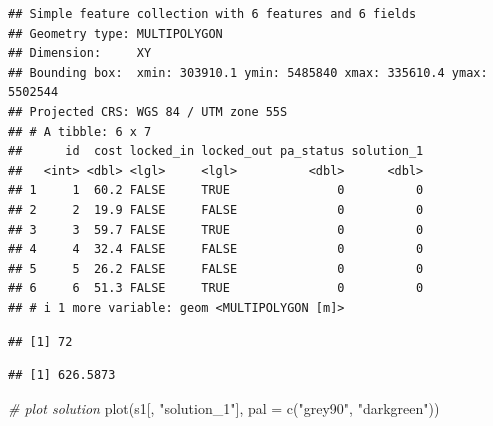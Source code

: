 \documentclass[
  12pt,
]{book}
\newenvironment{Shaded}{\begin{snugshade}}{\end{snugshade}}
\newcommand{\AttributeTok}[1]{\textcolor[rgb]{0.77,0.63,0.00}{#1}}
\newcommand{\CommentTok}[1]{\textcolor[rgb]{0.56,0.35,0.01}{\textit{#1}}}
\newcommand{\FunctionTok}[1]{\textcolor[rgb]{0.00,0.00,0.00}{#1}}
\newcommand{\NormalTok}[1]{#1}
\newcommand{\SpecialCharTok}[1]{\textcolor[rgb]{0.00,0.00,0.00}{#1}}
\newcommand{\StringTok}[1]{\textcolor[rgb]{0.31,0.60,0.02}{#1}}
\begin{document}
\begin{verbatim}
## Simple feature collection with 6 features and 6 fields
## Geometry type: MULTIPOLYGON
## Dimension:     XY
## Bounding box:  xmin: 303910.1 ymin: 5485840 xmax: 335610.4 ymax: 5502544
## Projected CRS: WGS 84 / UTM zone 55S
## # A tibble: 6 x 7
##      id  cost locked_in locked_out pa_status solution_1
##   <int> <dbl> <lgl>     <lgl>          <dbl>      <dbl>
## 1     1  60.2 FALSE     TRUE               0          0
## 2     2  19.9 FALSE     FALSE              0          0
## 3     3  59.7 FALSE     TRUE               0          0
## 4     4  32.4 FALSE     FALSE              0          0
## 5     5  26.2 FALSE     FALSE              0          0
## 6     6  51.3 FALSE     TRUE               0          0
## # i 1 more variable: geom <MULTIPOLYGON [m]>
\end{verbatim}

\begin{Shaded}
\end{Shaded}

\begin{verbatim}
## [1] 72
\end{verbatim}

\begin{Shaded}
\end{Shaded}

\begin{verbatim}
## [1] 626.5873
\end{verbatim}

\begin{Shaded}
\begin{Highlighting}[]
\CommentTok{\# plot solution}
\FunctionTok{plot}\NormalTok{(s1[, }\StringTok{"solution\_1"}\NormalTok{], }\AttributeTok{pal =} \FunctionTok{c}\NormalTok{(}\StringTok{"grey90"}\NormalTok{, }\StringTok{"darkgreen"}\NormalTok{))}
\end{Highlighting}
\end{Shaded}
\end{document}
